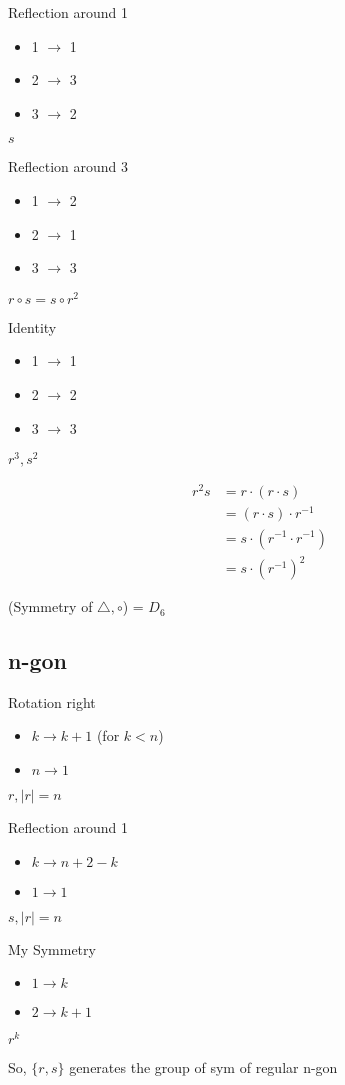 \begin{multicols}{3}
Reflection around 1
\begin{itemize}
  \item 1 $\rightarrow$ 1
  \item 2 $\rightarrow$ 3
  \item 3 $\rightarrow$ 2
\end{itemize}
$s$

\par
Reflection around 3
\begin{itemize}
  \item 1 $\rightarrow$ 2
  \item 2 $\rightarrow$ 1
  \item 3 $\rightarrow$ 3
\end{itemize}
$r \circ s = s \circ r^2$
\par
Identity 
\begin{itemize}
  \item 1 $\rightarrow$ 1
  \item 2 $\rightarrow$ 2
  \item 3 $\rightarrow$ 3
\end{itemize}
$r^3, s^2$
\end{multicols}
\begin{align*}
  r^2s &= r\cdot(r\cdot s) \\ 
  &= (r\cdot s) \cdot r^{-1} \\
  &= s \cdot (r^{-1} \cdot r^{-1}) \\
  &= s \cdot (r^{-1})^2
\end{align*}


(Symmetry of $\triangle, \circ$) = $D_6$
\pagebreak
\subsection{n-gon}


\begin{multicols}{3}
Rotation right
\begin{itemize}
  \item $k \rightarrow k + 1$ (for $k < n$)
  \item $n \rightarrow 1$
\end{itemize}
$r, |r| = n$
\par
Reflection around 1
\begin{itemize}
  \item $k \rightarrow n + 2 - k$
  \item $1 \rightarrow 1$
\end{itemize}
$s, |r| = n$
\par
My Symmetry
\begin{itemize}
  \item $1 \rightarrow k$
  \item $2 \rightarrow k + 1$
\end{itemize}
$r^k$
\end{multicols}
So, $\{r, s\}$ generates the group of sym of regular n-gon


